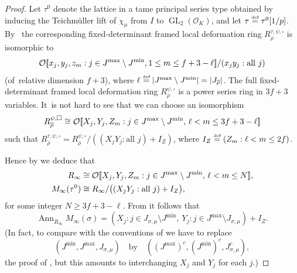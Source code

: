 \documentclass[JEP,XML,SOM,Unicode,NoFloatCountersInSection, NoEqCountersInSection,published]{cedram}
\let\ovl\overline
\newcommand{\defeq}{\stackrel{\textrm{\tiny{\upshape{def}}}}{=}}
\newcommand{\cO}{\mathcal{O}}
\newcommand{\brho}{\overline{\rho}}
\newcommand{\bbra}[1]{[\mkern-3mu[#1]\mkern-3mu]}
\DeclareMathOperator{\Ann}{Ann}
\DeclareMathOperator{\GL}{GL}
\theoremstyle{plain}
\theoremstyle{definition}
\begin{document}
\begin{proof}
Let $\tau^0$ denote the lattice in a tame principal series type obtained by inducing the Teichmüller lift of $\chi_\mu$ from $I$ to $\GL_2(\cO_K)$, and let $\tau \defeq \tau^0[1/p]$. By~\cite[Th.\,7.2.1]{EGS} the corresponding fixed-determinant framed local deformation ring $R_{\brho}^{\tau,\psi,\square}$ is isomorphic to
\[
\cO\bbra{x_j,y_j,z_m: j \in J^{\max} \setminus J^{\min}, 1 \le m \le f+3-\ell}/(x_j y_j: \text{all $j$})
\]
(of~relative dimension $f+3$), where $\ell \defeq |J^{\max} \setminus J^{\min}| = |J_{\brho}|$.
The full fixed-determinant framed local deformation ring $R_{\brho}^{\psi,\square}$ is a power series ring in $3f+3$ variables. It~is not hard to see that we can choose an isomorphism
\[
R_{\brho}^{\psi,\square} \cong \cO\bbra{X_j,Y_j,Z_m: j \in J^{\max} \setminus J^{\min},\,\ell < m \le 3f+3-\ell}
\]
such that $R_{\brho}^{\tau,\psi,\square} = R_{\brho}^{\psi,\square}/((X_j Y_j: \text{all $j$})+I_Z)$, where $I_Z \defeq (Z_m: \ell < m \le 2f)$.

Hence by \cite[Th.\,10.1.1]{EGS} we deduce that
\begin{align*}
R_\infty &\cong \cO\bbra{X_j,Y_j,Z_m: j \in J^{\max} \setminus J^{\min},\, \ell < m \le N}, \\
M_\infty(\tau^0) &\cong R_\infty/\bigl((X_j Y_j: \text{all $j$})+I_Z\bigr),
\end{align*}
for some integer $N \ge 3f+3-\ell$.
From \cite[Th.\,7.2.1(4), Lemma 10.1.12]{EGS} it follows that
\begin{equation}\label{eq:Ann-serre-wt}
\Ann_{\ovl R_\infty} M_\infty(\sigma) = (X_j: j \in J_{\sigma,\mu} \setminus J^{\min},\ Y_j: j \in J^{\max} \setminus J_{\sigma,\mu})+I_Z.
\end{equation}
{(In fact, to compare with the conventions of \cite{EGS} we have to replace
\[
(J^{\min},J^{\max},J_{\sigma,\mu})\quad\text{by}\quad ((J^{\max})^c,(J^{\min})^c,J_{\sigma,\mu}^c),
\]
\cf the proof of \cite[Lem.\,7.4.1]{EGS}, but this amounts to interchanging $X_j$ and $Y_j$ for each $j$.)}


\end{proof}
\end{document}
